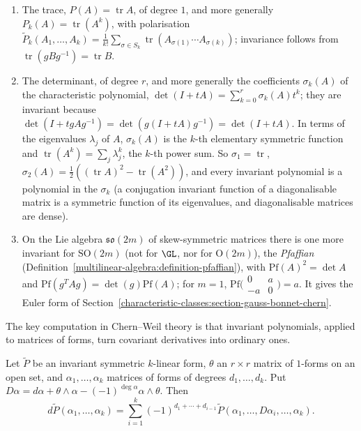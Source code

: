 \begin{example}\label{characteristic-classes:example-invariant-polynomials}
\begin{enumerate}
\item The trace, $P(A) = \operatorname{tr}A$, of degree $1$, and more generally $P_k(A) = \operatorname{tr}(A^k)$, with polarisation
$\tilde P_k(A_1, \ldots, A_k) = \frac1{k!}\sum_{\sigma \in S_k}\operatorname{tr}(A_{\sigma(1)} \cdots A_{\sigma(k)})$; invariance follows from $\operatorname{tr}(gBg^{-1}) = \operatorname{tr}B$.
\item The determinant, of degree $r$, and more generally the coefficients $\sigma_k(A)$ of the characteristic polynomial,
$\det(I + tA) = \sum_{k=0}^r\sigma_k(A)t^k$; they are invariant because $\det(I + tgAg^{-1}) = \det(g(I + tA)g^{-1}) = \det(I + tA)$. In terms of the eigenvalues $\lambda_j$ of $A$,
$\sigma_k(A)$ is the $k$-th elementary symmetric function and $\operatorname{tr}(A^k) = \sum_j\lambda_j^k$, the $k$-th power sum. So $\sigma_1 = \operatorname{tr}$,
$\sigma_2(A) = \frac12((\operatorname{tr}A)^2 - \operatorname{tr}(A^2))$, and every invariant polynomial is a polynomial in the $\sigma_k$ (a conjugation invariant function of a
diagonalisable matrix is a symmetric function of its eigenvalues, and diagonalisable matrices are dense).
\item On the Lie algebra $\mathfrak{so}(2m)$ of skew-symmetric matrices there is one more invariant for $\mathrm{SO}(2m)$ (not for $\GL$, nor for $\mathrm{O}(2m)$), the
\emph{Pfaffian} (Definition~\ref{multilinear-algebra:definition-pfaffian}), with $\mathrm{Pf}(A)^2 = \det A$ and $\mathrm{Pf}(g^TAg) = \det(g)\mathrm{Pf}(A)$; for $m = 1$,
$\mathrm{Pf}\bigl(\begin{smallmatrix} 0 & a\\ -a & 0\end{smallmatrix}\bigr) = a$. It gives the Euler form of Section~\ref{characteristic-classes:section-gauss-bonnet-chern}.
\end{enumerate}
\end{example}

The key computation in Chern--Weil theory is that invariant polynomials, applied to matrices of forms, turn covariant derivatives into ordinary ones.

\begin{lemma}\label{characteristic-classes:lemma-invariant-derivative}
Let $\tilde P$ be an invariant symmetric $k$-linear form, $\theta$ an $r \times r$ matrix of $1$-forms on an open set, and $\alpha_1, \ldots, \alpha_k$ matrices of forms of degrees
$d_1, \ldots, d_k$. Put $D\alpha = d\alpha + \theta \wedge \alpha - (-1)^{\deg\alpha}\alpha \wedge \theta$. Then
\[
d\tilde P(\alpha_1, \ldots, \alpha_k) = \sum_{i=1}^k(-1)^{d_1 + \cdots + d_{i-1}}\tilde P(\alpha_1, \ldots, D\alpha_i, \ldots, \alpha_k).
\]
\end{lemma}


